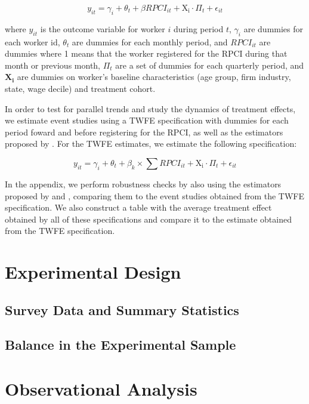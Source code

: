 \documentclass[oneside,11pt]{article}
\begin{document}
\begin{equation}
    y_{it} = \gamma_{i} + \theta_{t}+ \beta RPCI_{it} + \mathrm{X_i}\cdot\Pi_t + \epsilon_{it}
\end{equation}

where $y_{it}$ is the outcome variable for worker $i$ during period $t$, $\gamma_{i}$ are dummies for each worker id, $\theta_{t}$ are dummies for each monthly period, and $RPCI_{it}$ are dummies where 1 means that the worker registered for the RPCI during that month or previous month, $\Pi_t$ are a set of dummies for each quarterly period, and $\mathbf{X_i}$ are dummies on worker's baseline characteristics (age group, firm industry, state, wage decile) and treatment cohort.

In order to test for parallel trends and study the dynamics of treatment effects, we estimate event studies using a TWFE specification with dummies for each period foward and before registering for the RPCI, as well as the estimators proposed by \cite{de2020two}. For the TWFE estimates, we estimate the following specification:

\begin{equation}
    y_{it} = \gamma_{i} + \theta_{t}+ \beta_{k} \times \sum RPCI_{it} + \mathrm{X_i}\cdot\Pi_t + \epsilon_{it}
\end{equation}

In the appendix, we perform robustness checks by also using the estimators proposed by \cite{callaway2021difference} and \cite{sun2021estimating}, comparing them to the event studies obtained from the TWFE specification. We also construct a table with the average treatment effect obtained by all of these specifications and compare it to the estimate obtained from the TWFE specification.

\section{Experimental Design} \label{Experiment}

\subsection{Survey Data and Summary Statistics}

\subsection{Balance in the Experimental Sample}

\section{Observational Analysis} \label{observational}
\end{document}
